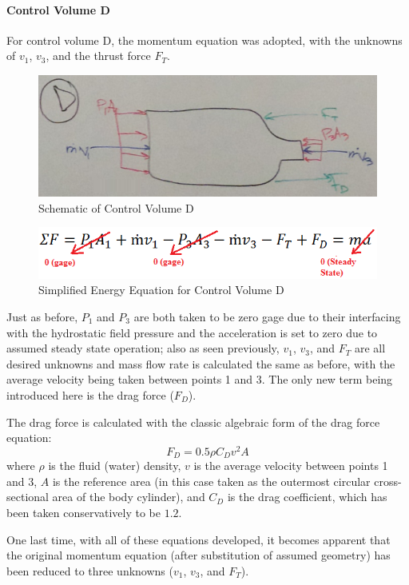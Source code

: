 \documentclass{report}
\begin{document}
\paragraph{Control Volume D}
For control volume D, the momentum equation was adopted, with the unknowns of $v_1$, $v_3$, and the thrust force $F_T$.
\begin{figure}[h]
\centering
\includegraphics{"Control Volume D"}
\caption{Schematic of Control Volume D}
\end{figure}
\begin{figure}[h]
\centering
\includegraphics{"Eqn D"}
\caption{Simplified Energy Equation for Control Volume D}
\end{figure}
Just as before, $P_1$ and $P_3$ are both taken to be zero gage due to their interfacing with the hydrostatic field pressure and the acceleration is set to zero due to assumed steady state operation; also as seen previously, $v_1$, $v_3$, and $F_T$ are all desired unknowns and mass flow rate is calculated the same as before, with the average velocity being taken between points 1 and 3.  The only new term being introduced here is the drag force ($F_D$).\par
The drag force is calculated with the classic algebraic form of the drag force equation:
\begin{equation}
F_D=0.5\rho C_D v^2 A
\end{equation}
where $\rho$ is the fluid (water) density, $v$ is the average velocity between points 1 and 3, $A$ is the reference area (in this case taken as the outermost circular cross-sectional area of the body cylinder), and $C_D$ is the drag coefficient, which has been taken conservatively to be $1.2$.\par
One last time, with all of these equations developed, it becomes apparent that the original momentum equation (after substitution of assumed geometry) has been reduced to three unknowns ($v_1$, $v_3$, and $F_T$).
\end{document}

